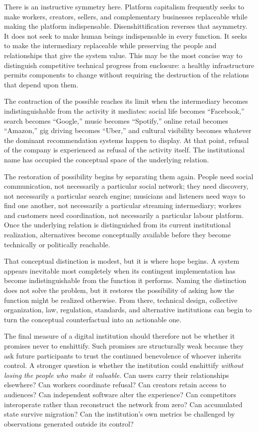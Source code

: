 \documentclass[11pt]{article}
\begin{document}
There is an instructive symmetry here. Platform capitalism frequently seeks to make workers, creators, sellers, and complementary businesses replaceable while making the platform indispensable. Disenshittification reverses that asymmetry. It does not seek to make human beings indispensable in every function. It seeks to make the intermediary replaceable while preserving the people and relationships that give the system value. This may be the most concise way to distinguish competitive technical progress from enclosure: a healthy infrastructure permits components to change without requiring the destruction of the relations that depend upon them.

The contraction of the possible reaches its limit when the intermediary becomes indistinguishable from the activity it mediates: social life becomes ``Facebook,'' search becomes ``Google,'' music becomes ``Spotify,'' online retail becomes ``Amazon,'' gig driving becomes ``Uber,'' and cultural visibility becomes whatever the dominant recommendation systems happen to display. At that point, refusal of the company is experienced as refusal of the activity itself. The institutional name has occupied the conceptual space of the underlying relation.

The restoration of possibility begins by separating them again. People need social communication, not necessarily a particular social network; they need discovery, not necessarily a particular search engine; musicians and listeners need ways to find one another, not necessarily a particular streaming intermediary; workers and customers need coordination, not necessarily a particular labour platform. Once the underlying relation is distinguished from its current institutional realization, alternatives become conceptually available before they become technically or politically reachable.

That conceptual distinction is modest, but it is where hope begins. A system appears inevitable most completely when its contingent implementation has become indistinguishable from the function it performs. Naming the distinction does not solve the problem, but it restores the possibility of asking how the function might be realized otherwise. From there, technical design, collective organization, law, regulation, standards, and alternative institutions can begin to turn the conceptual counterfactual into an actionable one.

The final measure of a digital institution should therefore not be whether it promises never to enshittify. Such promises are structurally weak because they ask future participants to trust the continued benevolence of whoever inherits control. A stronger question is whether the institution could enshittify \emph{without losing the people who make it valuable}. Can users carry their relationships elsewhere? Can workers coordinate refusal? Can creators retain access to audiences? Can independent software alter the experience? Can competitors interoperate rather than reconstruct the network from zero? Can accumulated state survive migration? Can the institution's own metrics be challenged by observations generated outside its control?
\end{document}

